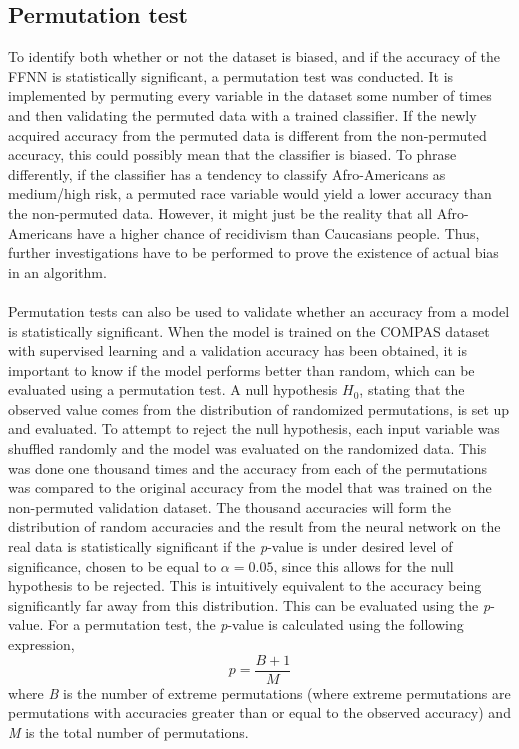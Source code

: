 \documentclass[11pt, fleqn, titlepage]{article}
\begin{document}
	\subsection{Permutation test}\label{permutation_test}
	To identify both whether or not the dataset is biased, and if the accuracy of the FFNN is statistically significant, a permutation test was conducted. It is implemented by permuting every variable in the dataset some number of times and then validating the permuted data with a trained classifier. If the newly acquired accuracy from the permuted data is different from the non-permuted accuracy, this could possibly mean that the classifier is biased. To phrase differently, if the classifier has a tendency to classify Afro-Americans as medium/high risk, a permuted race variable would yield a lower accuracy than the non-permuted data. However, it might just be the reality that all Afro-Americans have a higher chance of recidivism than Caucasians people. Thus, further investigations have to be performed to prove the existence of actual bias in an algorithm. \\\\
	Permutation tests can also be used to validate whether an accuracy from a model is statistically significant. When the model is trained on the COMPAS dataset with supervised learning and a validation accuracy has been obtained, it is important to know if the model performs better than random, which can be evaluated using a permutation test. A null hypothesis $H_{0}$, stating that the observed value comes from the distribution of randomized permutations, is set up and evaluated. To attempt to reject the null hypothesis, each input variable was shuffled randomly and the model was evaluated on the randomized data. This was done one thousand times and the accuracy from each of the permutations was compared to the original accuracy from the model that was trained on the non-permuted validation dataset. The thousand accuracies will form the distribution of random accuracies and the result from the neural network on the real data is statistically significant if the \textit{p}-value is under desired level of significance, chosen to be equal to $ \alpha = 0.05 $, since this allows for the null hypothesis to be rejected. This is intuitively equivalent to the accuracy being significantly far away from this distribution. 
	 This can be evaluated using the \textit{p}-value. For a permutation test, the \textit{p}-value is calculated using the following expression,
	\begin{equation}\label{pval}
	p=\frac{B+1}{M}
	\end{equation}
	where \textit{B} is the number of extreme permutations (where extreme permutations are permutations with accuracies greater than or equal to the observed accuracy) and \textit{M} is the total number of permutations. \cite{p-value}
	
\end{document}
